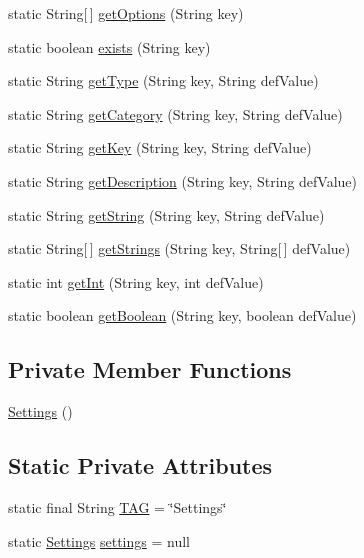 \begin{DoxyCompactItemize}
\item 
static String\mbox{[}$\,$\mbox{]} \hyperlink{classpt_1_1lsts_1_1asa_1_1settings_1_1Settings_aca65507452b71620b58a23521751027e}{get\+Options} (String key)
\item 
static boolean \hyperlink{classpt_1_1lsts_1_1asa_1_1settings_1_1Settings_accfc82b1ee86ef4e9bee8520c544944e}{exists} (String key)
\item 
static String \hyperlink{classpt_1_1lsts_1_1asa_1_1settings_1_1Settings_af431b67c6421743053ef658f18592102}{get\+Type} (String key, String def\+Value)
\item 
static String \hyperlink{classpt_1_1lsts_1_1asa_1_1settings_1_1Settings_a544a8c09568c9b8566bb6f18edb2c258}{get\+Category} (String key, String def\+Value)
\item 
static String \hyperlink{classpt_1_1lsts_1_1asa_1_1settings_1_1Settings_a8a8d0bbf0941154fe44cf1cf21fe9f24}{get\+Key} (String key, String def\+Value)
\item 
static String \hyperlink{classpt_1_1lsts_1_1asa_1_1settings_1_1Settings_a19707bcfc8eaf45eaffe3a86b3657364}{get\+Description} (String key, String def\+Value)
\item 
static String \hyperlink{classpt_1_1lsts_1_1asa_1_1settings_1_1Settings_aa78bb0429e56d58dc891df61404bdb0e}{get\+String} (String key, String def\+Value)
\item 
static String\mbox{[}$\,$\mbox{]} \hyperlink{classpt_1_1lsts_1_1asa_1_1settings_1_1Settings_a5cbf61d0dd3c4a87c7a1b7d3a965a671}{get\+Strings} (String key, String\mbox{[}$\,$\mbox{]} def\+Value)
\item 
static int \hyperlink{classpt_1_1lsts_1_1asa_1_1settings_1_1Settings_a6837acc4e04ce43560ab198fb0e68acc}{get\+Int} (String key, int def\+Value)
\item 
static boolean \hyperlink{classpt_1_1lsts_1_1asa_1_1settings_1_1Settings_ac71827af5d162d6c779eafc2c221b32d}{get\+Boolean} (String key, boolean def\+Value)
\end{DoxyCompactItemize}
\subsection*{Private Member Functions}
\begin{DoxyCompactItemize}
\item 
\hyperlink{classpt_1_1lsts_1_1asa_1_1settings_1_1Settings_af47a960faacc382ad1b68b98d4d12af0}{Settings} ()
\end{DoxyCompactItemize}
\subsection*{Static Private Attributes}
\begin{DoxyCompactItemize}
\item 
static final String \hyperlink{classpt_1_1lsts_1_1asa_1_1settings_1_1Settings_afe525f965dac49df0ee4b379c021c21d}{T\+A\+G} = \char`\"{}Settings\char`\"{}
\item 
static \hyperlink{classpt_1_1lsts_1_1asa_1_1settings_1_1Settings}{Settings} \hyperlink{classpt_1_1lsts_1_1asa_1_1settings_1_1Settings_a2dc5edfa99b6440deb085ee9b010051f}{settings} = null
\end{DoxyCompactItemize}


